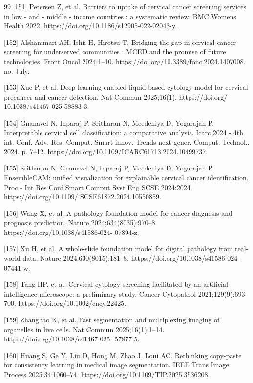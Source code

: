 \documentclass[final,5p,times,twocolumn,authoryear]{elsarticle}
\begin{document}
\begin{thebibliography}{99}
 [151] Petersen Z, et al. Barriers to uptake of cervical cancer screening services in low - and - middle - income countries : a systematic review. BMC Womens Health 2022. https://doi.org/10.1186/s12905-022-02043-y.

 [152] Alshammari AH, Ishii H, Hirotsu T. Bridging the gap in cervical cancer screening for underserved communities : MCED and the promise of future technologies. Front Oncol 2024:1–10. https://doi.org/10.3389/fonc.2024.1407008. no. July.

 [153] Xue P, et al. Deep learning enabled liquid-based cytology model for cervical precancer and cancer detection. Nat Commun 2025;16(1). https://doi.org/ 10.1038/s41467-025-58883-3.

 [154] Gnanavel N, Inparaj P, Sritharan N, Meedeniya D, Yogarajah P. Interpretable cervical cell classification: a comparative analysis. Icarc 2024 - 4th int. Conf. Adv. Res. Comput. Smart innov. Trends next gener. Comput. Technol.. 2024. p. 7–12. https://doi.org/10.1109/ICARC61713.2024.10499737.

 [155] Sritharan N, Gnanavel N, Inparaj P, Meedeniya D, Yogarajah P. EnsembleCAM: unified visualization for explainable cervical cancer identification. Proc - Int Res Conf Smart Comput Syst Eng SCSE 2024;2024. https://doi.org/10.1109/ SCSE61872.2024.10550859.

 [156] Wang X, et al. A pathology foundation model for cancer diagnosis and prognosis prediction. Nature 2024;634(8035):970–8. https://doi.org/10.1038/s41586-024- 07894-z.

 [157] Xu H, et al. A whole-slide foundation model for digital pathology from real-world data. Nature 2024;630(8015):181–8. https://doi.org/10.1038/s41586-024- 07441-w.

 [158] Tang HP, et al. Cervical cytology screening facilitated by an artificial intelligence microscope: a preliminary study. Cancer Cytopathol 2021;129(9):693–700. https://doi.org/10.1002/cncy.22425.

 [159] Zhanghao K, et al. Fast segmentation and multiplexing imaging of organelles in live cells. Nat Commun 2025;16(1):1–14. https://doi.org/10.1038/s41467-025- 57877-5.

[160] Huang S, Ge Y, Liu D, Hong M, Zhao J, Loui AC. Rethinking copy-paste for consistency learning in medical image segmentation. IEEE Trans Image Process 2025;34:1060–74. https://doi.org/10.1109/TIP.2025.3536208.


\end{thebibliography}
\end{document}
